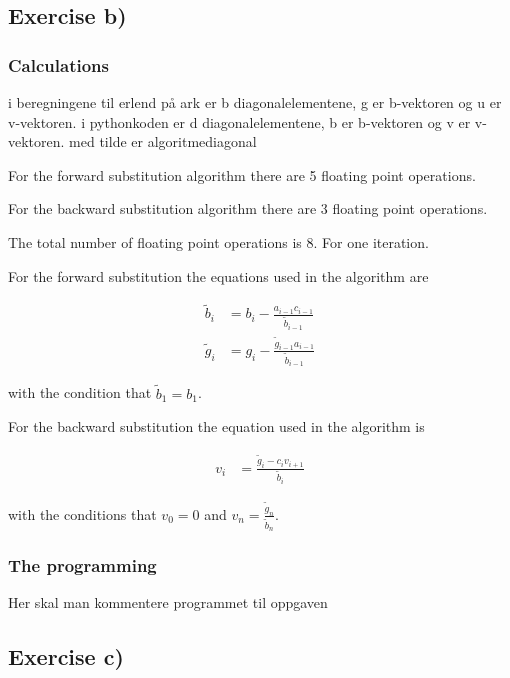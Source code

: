 \documentclass{article}
\begin{document}
  \subsection{Exercise b)}

    \subsubsection{Calculations}

    i beregningene til erlend på ark er b diagonalelementene, g er b-vektoren og u er v-vektoren. i pythonkoden er d diagonalelementene, b er b-vektoren og v er v-vektoren. med tilde er algoritmediagonal

    For the forward substitution algorithm there are 5 floating point operations.

    For the backward substitution algorithm there are 3 floating point operations.

    The total number of floating point operations is 8. For one iteration.

    For the forward substitution the equations used in the algorithm are

    \begin{align*}
      \tilde{b}_i &= b_i - \frac{a_{i-1} c_{i-1}}{\tilde{b} _{i-1}} \\
      \tilde{g}_i &= g_i - \frac{\tilde{g}_{i-1} a_{i-1}}{\tilde{b}_{i-1}}
    \end{align*}

    with the condition that $\tilde{b}_1 = b_1$.

    For the backward substitution the equation used in the algorithm is

    \begin{align*}
      v_i &= \frac{\tilde{g}_i - c_i v_{i+1}}{\tilde{b}_i}
    \end{align*}

    with the conditions that $v_0 = 0$ and $v_n = \frac{\tilde{g}_n}{\tilde{b}_n}$.

    \subsubsection{The programming}

    Her skal man kommentere programmet til oppgaven


  \subsection{Exercise c)}
\end{document}

